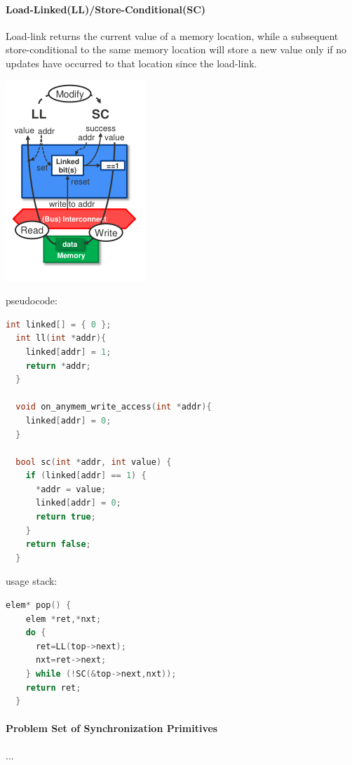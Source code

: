 \documentclass[8pt]{extarticle}
\begin{document}
\begin{multicols*}{4}
\paragraph{Load-Linked(LL)/Store-Conditional(SC)}Load-link returns the current value of a memory location, while a subsequent store-conditional to the same memory location will store a new value only if no updates have occurred to that location since the load-link.


\begin{center}
  \includegraphics[width=0.4\linewidth]{img/load-linked_overview.png}
  \label{fig:load-linked_overview}
\end{center}

pseudocode:

\begin{lstlisting}[language=c, numbers=none]
  int linked[] = { 0 };
  int ll(int *addr){
    linked[addr] = 1;
    return *addr;
  }

  void on_anymem_write_access(int *addr){
    linked[addr] = 0;
  }

  bool sc(int *addr, int value) {
    if (linked[addr] == 1) {
      *addr = value;
      linked[addr] = 0;
      return true;
    }
    return false;
  }
\end{lstlisting} %

usage stack:

\begin{lstlisting}[language=c, numbers=none]
  elem* pop() {
    elem *ret,*nxt;
    do {
      ret=LL(top->next);
      nxt=ret->next;
    } while (!SC(&top->next,nxt));
    return ret;
  }
\end{lstlisting} %



\paragraph{Problem Set of Synchronization Primitives}...


\end{multicols*}
\end{document}
